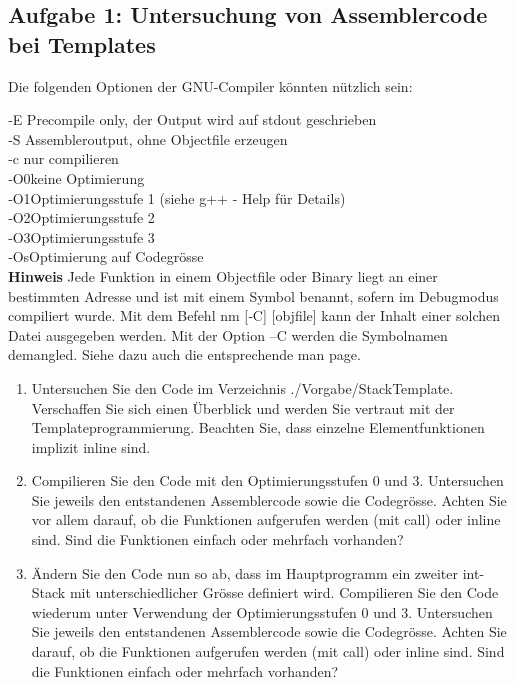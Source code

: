 \subsection{Aufgabe 1: Untersuchung von Assemblercode bei Templates}

Die folgenden Optionen der GNU-Compiler könnten nützlich sein:

‐E \qquad  Precompile only, der Output wird auf stdout geschrieben\\
‐S \qquad Assembleroutput, ohne Objectfile erzeugen\\
‐c \qquad nur compilieren\\
‐O0\qquad  keine Optimierung\\
‐O1\qquad  Optimierungsstufe 1 (siehe g++ - Help für Details)\\
‐O2\qquad  Optimierungsstufe 2\\
‐O3\qquad  Optimierungsstufe 3\\
‐Os\qquad  Optimierung auf Codegrösse\\

\textbf{Hinweis}
Jede Funktion in einem Objectfile oder Binary liegt an einer bestimmten Adresse und ist mit einem Symbol
benannt, sofern im Debugmodus compiliert wurde. Mit dem Befehl nm [‐C] [objfile] kann der Inhalt
einer solchen Datei ausgegeben werden. Mit der Option –C werden die Symbolnamen demangled. Siehe
dazu auch die entsprechende man page.

\begin{enumerate}
  \item  Untersuchen Sie den Code im Verzeichnis ./Vorgabe/StackTemplate.
Verschaffen Sie sich einen Überblick und werden Sie vertraut mit der Templateprogrammierung. Beachten
Sie, dass einzelne Elementfunktionen implizit inline sind.
\item Compilieren Sie den Code mit den Optimierungsstufen 0 und 3. Untersuchen Sie jeweils den entstandenen
Assemblercode sowie die Codegrösse. Achten Sie vor allem darauf, ob die Funktionen aufgerufen
werden (mit call) oder inline sind. Sind die Funktionen einfach oder mehrfach vorhanden?
\item Ändern Sie den Code nun so ab, dass im Hauptprogramm ein zweiter int-Stack mit unterschiedlicher
Grösse definiert wird.
Compilieren Sie den Code wiederum unter Verwendung der Optimierungsstufen 0 und 3. Untersuchen
Sie jeweils den entstandenen Assemblercode sowie die Codegrösse. Achten Sie darauf, ob die Funktionen
aufgerufen werden (mit call) oder inline sind. Sind die Funktionen einfach oder mehrfach vorhanden?
\end{enumerate}

